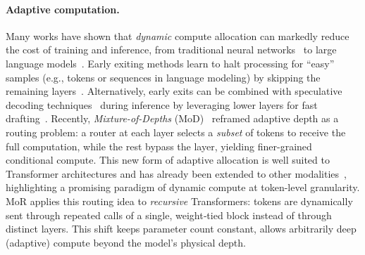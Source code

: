 \paragraph{Adaptive computation.}
Many works have shown that \emph{dynamic} compute allocation can markedly reduce the cost of training and inference, from traditional neural networks~\citep{bengio2015conditional, DBLP:conf/eccv/HuangSLSW16, teerapittayanon2016branchynet, panda2016conditional, graves2016adaptive} to large language models~\citep{hou2020dynabert,Elbayad2020Depth-Adaptive,fedus2022switch,bae-etal-2023-fast, elhoushi2024layerskip, raposo2024mixture}.
%
Early exiting methods learn to halt processing for ``easy'' samples (e.g., tokens or sequences in language modeling) by skipping the remaining layers~\citep{Elbayad2020Depth-Adaptive, schuster2022confident, dehghani2018universal,mofakhami2024performance}. Alternatively, early exits can be combined with speculative decoding techniques~\citep{chen2023accelerating,leviathan2023fast} during inference by leveraging lower layers for fast drafting~\citep{bae-etal-2023-fast, elhoushi2024layerskip}.
%
Recently, \textit{Mixture-of-Depths} (MoD)~\citep{raposo2024mixture} reframed adaptive depth as a routing problem: a router at each layer selects a \emph{subset} of tokens to receive the full computation, while the rest bypass the layer, yielding finer-grained conditional compute.  
This new form of adaptive allocation is well suited to Transformer architectures and has already been extended to other modalities~\citep{zhang2024p,luo2024gamma}, highlighting a promising paradigm of dynamic compute at token-level granularity.
%
MoR applies this routing idea to \emph{recursive} Transformers: tokens are dynamically sent through repeated calls of a single, weight‑tied block instead of through distinct layers. This shift keeps parameter count constant, allows arbitrarily deep (adaptive) compute beyond the model’s physical depth.



\vspace{-10pt}
